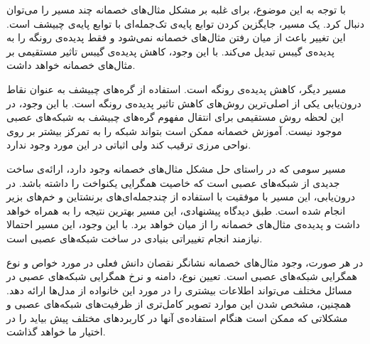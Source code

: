 \documentclass[12pt,onecolumn,a4paper]{article}
\begin{document}
با توجه به این موضوع، برای غلبه بر مشکل مثال‌های خصمانه چند مسیر را می‌توان دنبال کرد. یک مسیر، جایگزین کردن توابع پایه‌ی تک‌جمله‌ای با توابع پایه‌ی چبیشف است. این تغییر باعث از میان رفتن مثال‌های خصمانه نمی‌شود و فقط پدیده‌ی رونگه را به پدیده‌ی گیبس تبدیل می‌کند. با این وجود، کاهش پدیده‌ی گیبس تاثیر مستقیمی بر مثال‌های خصمانه خواهد داشت.

مسیر دیگر، کاهش پدیده‌ی رونگه است. استفاده از گره‌های چبیشف به عنوان نقاط درون‌یابی یکی از اصلی‌ترین روش‌های کاهش تاثیر پدیده‌ی رونگه است. با این وجود، در این لحظه روش مستقیمی برای انتقال مفهوم گره‌های چبیشف به شبکه‌های عصبی موجود نیست. آموزش خصمانه ممکن است بتواند شبکه را به تمرکز بیشتر بر روی نواحی مرزی ترقیب کند ولی اثباتی در این مورد وجود ندارد.

مسیر سومی که در راستای حل مشکل مثال‌های خصمانه وجود دارد، ارائه‌ی ساخت جدیدی از شبکه‌های عصبی است که خاصیت همگرایی یکنواخت را داشته باشد. در درون‌یابی، این مسیر با موفقیت با استفاده از چندجمله‌ای‌های برنشتاین و خم‌های بزیر انجام شده است. طبق دیدگاه پیشنهادی، این مسیر بهترین نتیجه را به همراه خواهد داشت و پدیده‌ی مثال‌های خصمانه را از میان خواهد برد. با این وجود، این مسیر احتمالا نیازمند انجام تغییراتی بنیادی در ساخت شبکه‌های عصبی است.

در هر صورت، وجود مثال‌های خصمانه نشانگر نقصان دانش فعلی در مورد خواص و نوع همگرایی شبکه‌های عصبی است. تعیین نوع، دامنه و نرخ همگرایی شبکه‌های عصبی در مسائل مختلف  می‌تواند اطلاعات بیشتری را در مورد این خانواده از مدل‌ها ارائه دهد. همچنین، مشخص شدن این موارد تصویر کامل‌تری از ظرفیت‌های شبکه‌های عصبی و مشکلاتی که ممکن است هنگام استفاده‌ی آنها در کاربردهای مختلف پیش بیاید را در اختیار ما خواهد گذاشت.

\setLTRbibitems


\end{document}

